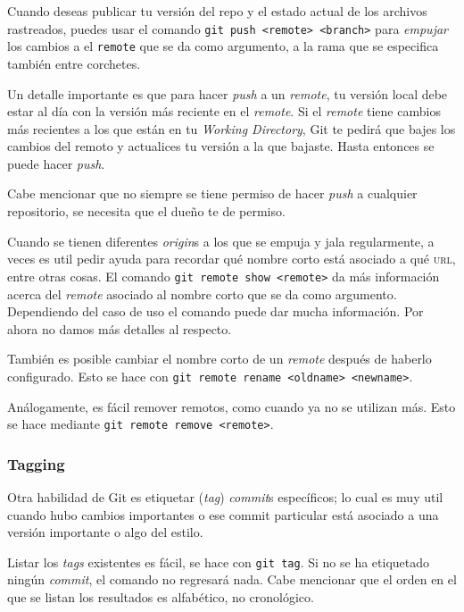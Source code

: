 \documentclass[spanish, 12pt, a4paper]{article}
\begin{document}
Cuando deseas publicar tu versión del repo y el estado actual de los
archivos rastreados, puedes usar el comando
\passthrough{\lstinline!git push <remote> <branch>!} para \emph{empujar}
los cambios a el \passthrough{\lstinline!remote!} que se da como
argumento, a la rama que se especifica también entre corchetes.

Un detalle importante es que para hacer \emph{push} a un \emph{remote},
tu versión local debe estar al día con la versión más reciente en el
\emph{remote}. Si el \emph{remote} tiene cambios más recientes a los que
están en tu \emph{Working Directory}, Git te pedirá que bajes los
cambios del remoto y actualices tu versión a la que bajaste. Hasta
entonces se puede hacer \emph{push}.

Cabe mencionar que no siempre se tiene permiso de hacer \emph{push} a
cualquier repositorio, se necesita que el dueño te de permiso.

Cuando se tienen diferentes \emph{origin}s a los que se empuja y jala
regularmente, a veces es util pedir ayuda para recordar qué nombre corto
está asociado a qué \textsc{url}, entre otras cosas. El comando
\passthrough{\lstinline!git remote show <remote>!} da más información
acerca del \emph{remote} asociado al nombre corto que se da como
argumento. Dependiendo del caso de uso el comando puede dar mucha
información. Por ahora no damos más detalles al respecto.

También es posible cambiar el nombre corto de un \emph{remote} después
de haberlo configurado. Esto se hace con
\passthrough{\lstinline!git remote rename <oldname> <newname>!}.

Análogamente, es fácil remover remotos, como cuando ya no se utilizan
más. Esto se hace mediante
\passthrough{\lstinline!git remote remove <remote>!}.

\subsubsection{Tagging}

Otra habilidad de Git es etiquetar (\emph{tag}) \emph{commit}s
específicos; lo cual es muy util cuando hubo cambios importantes o ese
commit particular está asociado a una versión importante o algo del
estilo.

Listar los \emph{tags} existentes es fácil, se hace con
\passthrough{\lstinline!git tag!}. Si no se ha etiquetado ningún
\emph{commit}, el comando no regresará nada. Cabe mencionar que el orden
en el que se listan los resultados es alfabético, no cronológico.
\end{document}
